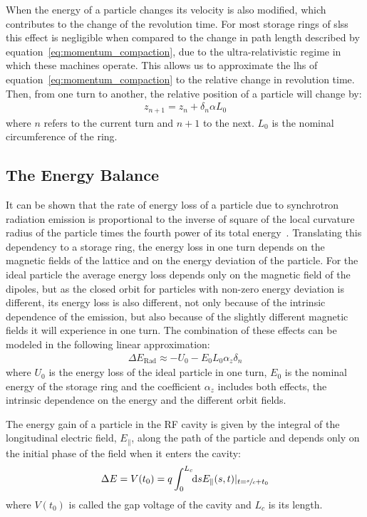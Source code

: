     When the energy of a particle changes its velocity is also modified, which contributes to the change of the revolution time. For most storage rings of \glspl{sls} this effect is negligible when compared to the change in path length described by equation~\eqref{eq:momentum_compaction}, due to the ultra-relativistic regime in which these machines operate. This allows us to approximate the \gls{lhs} of equation~\eqref{eq:momentum_compaction} to the relative change in revolution time. Then, from one turn to another, the relative position of a particle will change by:
	\begin{align}\label{eq:revolution_time_variation}
		z_{n+1} = z_n + \delta_n\alpha L_0
	\end{align}
	where $n$ refers to the current turn and $n+1$ to the next. $L_0$ is the nominal circumference of the ring.

\subsection{The Energy Balance}

	It can be shown that the rate of energy loss of a particle due to synchrotron radiation emission is proportional to the inverse of square of the local curvature radius of the particle times the fourth power of its total energy~\cite[pp. 661: eq. 14.31]{Jackson1975}. Translating this dependency to a storage ring, the energy loss in one turn depends on the magnetic fields of the lattice and on the energy deviation of the particle. For the ideal particle the average energy loss depends only on the magnetic field of the dipoles, but as the closed orbit for particles with non-zero energy deviation is different, its energy loss is also different, not only because of the intrinsic dependence of the emission, but also because of the slightly different magnetic fields it will experience in one turn. The combination of these effects can be modeled in the following linear approximation:
	\begin{align}\label{eq:radiation_loss}
		\Delta E_\text{Rad} \approx -U_0 - E_0L_0\alpha_z\delta_n
	\end{align}
	where $U_0$ is the energy loss of the ideal particle in one turn, $E_0$ is the nominal energy of the storage ring and the coefficient $\alpha_z$ includes both effects, the intrinsic dependence on the energy and the different orbit fields.

	The energy gain of a particle in the RF cavity is given by the integral of the longitudinal electric field, $E_\parallel$, along the path of the particle and depends only on the initial phase of the field when it enters the cavity:
	\begin{align}
		\Delta E = V(t_0) = q\defint{s}{E_\parallel(s,t)|_{t=\sfrac{s}{c}+t_0}}{0}{L_c}
	\end{align}
	where $V(t_0)$ is called the gap voltage of the cavity and $L_c$ is its length.

